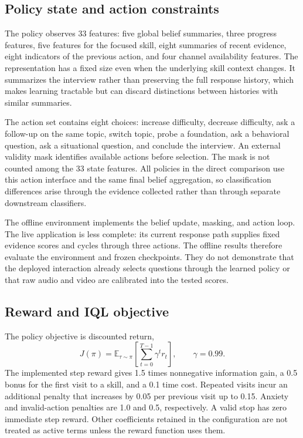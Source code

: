 \documentclass[10pt,a4paper]{article}
\begin{document}
\subsection{Policy state and action constraints}
The policy observes 33 features: five global belief summaries, three progress features, five features for the focused skill, eight summaries of recent evidence, eight indicators of the previous action, and four channel availability features. The representation has a fixed size even when the underlying skill context changes. It summarizes the interview rather than preserving the full response history, which makes learning tractable but can discard distinctions between histories with similar summaries.

The action set contains eight choices: increase difficulty, decrease difficulty, ask a follow-up on the same topic, switch topic, probe a foundation, ask a behavioral question, ask a situational question, and conclude the interview. An external validity mask identifies available actions before selection. The mask is not counted among the 33 state features. All policies in the direct comparison use this action interface and the same final belief aggregation, so classification differences arise through the evidence collected rather than through separate downstream classifiers.

The offline environment implements the belief update, masking, and action loop. The live application is less complete: its current response path supplies fixed evidence scores and cycles through three actions. The offline results therefore evaluate the environment and frozen checkpoints. They do not demonstrate that the deployed interaction already selects questions through the learned policy or that raw audio and video are calibrated into the tested scores.

\subsection{Reward and IQL objective}
The policy objective is discounted return,
\begin{equation}
J(\pi)=\mathbb{E}_{\tau\sim\pi}\left[\sum_{t=0}^{T-1}\gamma^t r_t\right],\qquad\gamma=0.99.
\end{equation}
The implemented step reward gives 1.5 times nonnegative information gain, a 0.5 bonus for the first visit to a skill, and a 0.1 time cost. Repeated visits incur an additional penalty that increases by 0.05 per previous visit up to 0.15. Anxiety and invalid-action penalties are 1.0 and 0.5, respectively. A valid stop has zero immediate step reward. Other coefficients retained in the configuration are not treated as active terms unless the reward function uses them.
\end{document}
